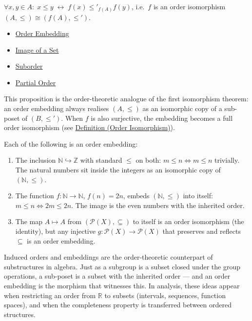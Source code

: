 \begin{remark*}
$\forall x,y \in A:\; x \leq y \;\leftrightarrow\; f(x) \leq'_{f(A)} f(y)$, i.e.\ $f$ is an order isomorphism $(A,\leq)\cong(f(A),\leq')$.
\end{remark*}




\begin{dependencies}
\begin{itemize}
  \item \hyperref[def:order-embedding]{Order Embedding}
  \item \hyperref[def:image-set]{Image of a Set}
  \item \hyperref[def:suborder]{Suborder}
  \item \hyperref[def:partial-order]{Partial Order}
\end{itemize}
\end{dependencies}

\begin{remark*}[Consequence]
This proposition is the order-theoretic analogue of the first isomorphism
theorem: an order embedding always realises $(A,\leq)$ as an isomorphic
copy of a sub-poset of $(B,\leq')$. When $f$ is also surjective, the
embedding becomes a full order isomorphism
(see \hyperref[def:order-iso]{Definition (Order Isomorphism)}).
\end{remark*}

\begin{example*}
Each of the following is an order embedding:
\begin{enumerate}[label=(\roman*)]
  \item The inclusion $\mathbb{N} \hookrightarrow \mathbb{Z}$ with standard
        $\leq$ on both: $m \leq n \iff m \leq n$ trivially. The natural
        numbers sit inside the integers as an isomorphic copy of $(\mathbb{N},\leq)$.
  \item The function $f : \mathbb{N} \to \mathbb{N}$, $f(n) = 2n$, embeds
        $(\mathbb{N},\leq)$ into itself: $m \leq n \iff 2m \leq 2n$.
        The image is the even numbers with the inherited order.
  \item The map $A \mapsto A$ from $(\mathcal{P}(X), \subseteq)$ to itself
        is an order isomorphism (the identity), but any injective
        $g : \mathcal{P}(X) \to \mathcal{P}(X)$ that preserves and reflects
        $\subseteq$ is an order embedding.
\end{enumerate}
\end{example*}

\begin{remark*}[Transition]
Induced orders and embeddings are the order-theoretic counterpart of
substructures in algebra. Just as a subgroup is a subset closed under the
group operations, a sub-poset is a subset with the inherited order ---
and an order embedding is the morphism that witnesses this. In analysis,
these ideas appear when restricting an order from $\mathbb{R}$ to subsets
(intervals, sequences, function spaces), and when the completeness property
is transferred between ordered structures.
\end{remark*}
